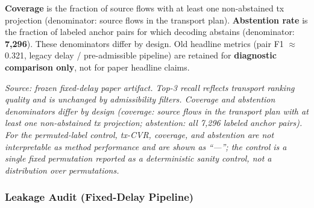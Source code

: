 \textbf{Coverage} is the fraction of source flows with at least one non-abstained tx projection (denominator: source flows in the transport plan). \textbf{Abstention rate} is the fraction of labeled anchor pairs for which decoding abstains (denominator: \textbf{7{,}296}). These denominators differ by design. Old headline metrics (pair F1 $\approx$ 0.321, legacy delay / pre-admissible pipeline) are retained for \textbf{diagnostic comparison only}, not for paper headline claims.

\begin{table}[!t]
\caption{Fixed-delay RC-UOT-Q main results (full anchor pairs; decode-only; transport frozen).}
\label{tab:fixeddelay}
\centering
\footnotesize
\setlength{\tabcolsep}{3.5pt}
\end{table}

\emph{Source: frozen fixed-delay paper artifact. Top-3 recall reflects transport ranking quality and is unchanged by admissibility filters. Coverage and abstention denominators differ by design (coverage: source flows in the transport plan with at least one non-abstained tx projection; abstention: all 7{,}296 labeled anchor pairs). For the permuted-label control, tx-CVR, coverage, and abstention are not interpretable as method performance and are shown as ``---''; the control is a single fixed permutation reported as a deterministic sanity control, not a distribution over permutations.}

\subsubsection{Leakage Audit (Fixed-Delay Pipeline)}
\label{sec:leakage}


